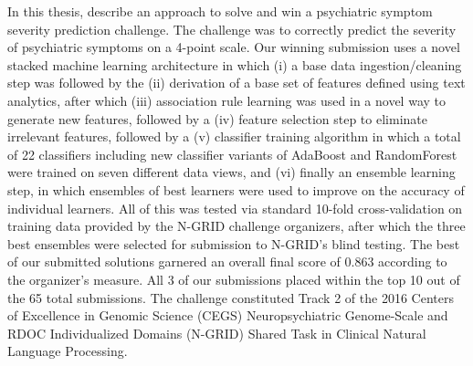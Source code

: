 In this thesis, describe an approach to solve and win a psychiatric symptom severity prediction challenge. The challenge was to correctly predict the severity of psychiatric symptoms on a 4-point scale. Our winning submission uses a novel stacked machine learning architecture in which (i) a base data ingestion/cleaning step was followed by the (ii) derivation of a base set of features defined using text analytics, after which (iii) association rule learning was used in a novel way to generate new features, followed by a (iv) feature selection step to eliminate irrelevant features, followed by a (v) classifier training algorithm in which a total of 22 classifiers including new classifier variants of AdaBoost and RandomForest were trained on seven different data views, and (vi) finally an ensemble learning step, in which ensembles of best learners were used to improve on the accuracy of individual learners. All of this was tested via standard 10-fold cross-validation on training data provided by the N-GRID challenge organizers, after which the three best ensembles were selected for submission to N-GRID's blind testing. The best of our submitted solutions garnered an overall final score of 0.863 according to the organizer's measure. All 3 of our submissions placed within the top 10 out of the 65 total submissions. The challenge constituted Track 2 of the 2016 Centers of Excellence in Genomic Science (CEGS) Neuropsychiatric Genome-Scale and RDOC Individualized Domains (N-GRID) Shared Task in Clinical Natural Language Processing.  
